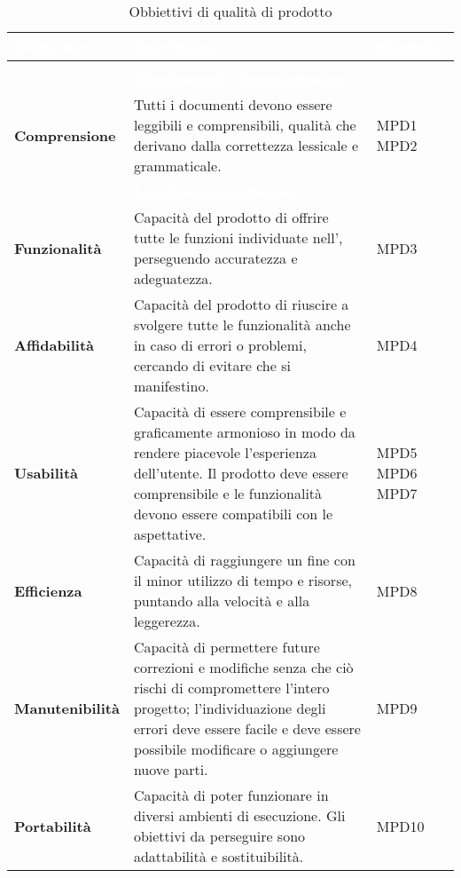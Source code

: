 \begin{longtable}{C{3cm} | C{9.5cm} | C{2.5cm}}

\textcolor{white}{\textbf{Obbiettivo}}&
\textcolor{white}{\textbf{Descrizione}}&
\textcolor{white}{\textbf{Metriche}} \\
\endfirsthead
{}\\
\endfoot
{}\caption{Obbiettivi di qualità di prodotto}
\endlastfoot
	
 & \textcolor{white}{\textbf{Monitoraggio documentazione}} &  \\

	\textbf{Comprensione} &
	 Tutti i documenti devono essere leggibili e comprensibili, qualità che derivano dalla correttezza lessicale e grammaticale. &
	MPD1 \newline MPD2 \\
 
 & \textcolor{white}{\textbf{Monitoraggio software}} &  \\
 
	\textbf{Funzionalità} & 
	Capacità del prodotto di offrire tutte le funzioni individuate nell'\AdRv{}, perseguendo accuratezza e adeguatezza. &
	MPD3 \\
	
	\textbf{Affidabilità} &
	 Capacità del prodotto di riuscire a svolgere tutte le funzionalità anche in caso di errori o problemi, cercando di evitare che si manifestino. &
	MPD4 \\
	
	\textbf{Usabilità} &
	Capacità di essere comprensibile e graficamente armonioso in modo da rendere piacevole l'esperienza dell'utente. Il prodotto deve essere comprensibile e le funzionalità devono essere compatibili con le aspettative. &
    MPD5 \newline MPD6 \newline MPD7 \\
    
	\textbf{Efficienza} & 
	Capacità di raggiungere un fine con il minor utilizzo di tempo e risorse, puntando alla velocità e alla leggerezza. &
	MPD8 \\
	
	\textbf{Manutenibilità} & 
	Capacità di permettere future correzioni e modifiche senza che ciò rischi di compromettere l'intero progetto; l'individuazione degli errori deve essere facile e deve essere possibile modificare o aggiungere nuove parti. &
 	MPD9 \\
 	
	\textbf{Portabilità} & 
	Capacità di poter funzionare in diversi ambienti di esecuzione. Gli obiettivi da perseguire sono adattabilità e sostituibilità. &
	MPD10 \\
	
\end{longtable}	

